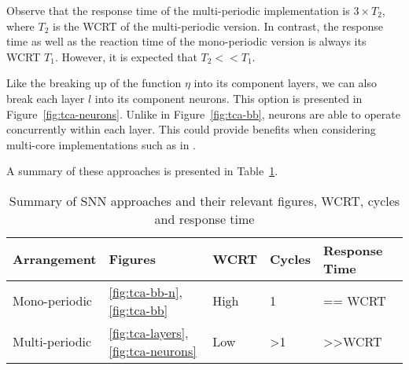 Observe that the response time of the multi-periodic implementation is
$3 \times T_2$, where $T_2$ is the \ac{WCRT} of the multi-periodic
version. In contrast, the response time as well as the reaction time
of the mono-periodic version is always its \ac{WCRT} $T_1$. However, it is
expected that $T_2 << T_1$.

Like the breaking up of the function $\eta$ into its component
layers, we can also break each layer $l$ into its component neurons.
This option is presented in Figure~\ref{fig:tca-neurons}. 
Unlike in Figure~\ref{fig:tca-bb}, neurons are able to operate concurrently within each layer. 
This could provide benefits when considering multi-core
implementations such as in \cite{yuan2011compiling}.

A summary of these approaches is presented in Table~\ref{tbl:sann-approaches}.
\begin{table}[h]
	\centering
	\caption{Summary of \ac{SNN} approaches and their relevant figures, \ac{WCRT}, cycles and response time}
	\label{tbl:sann-approaches}
	\begin{tabular}{|l|l|l|l|l|}
		\hline
		Arrangement    & Figures & WCRT & Cycles & Response Time   \\ \hline
		Mono-periodic  & \ref{fig:tca-bb-n},\ref{fig:tca-bb} & High & 1 & == WCRT              \\
		Multi-periodic & \ref{fig:tca-layers},\ref{fig:tca-neurons}& Low  & \textgreater{}1 & \textgreater{}\textgreater{}WCRT \\ \hline
	\end{tabular}
\end{table}



